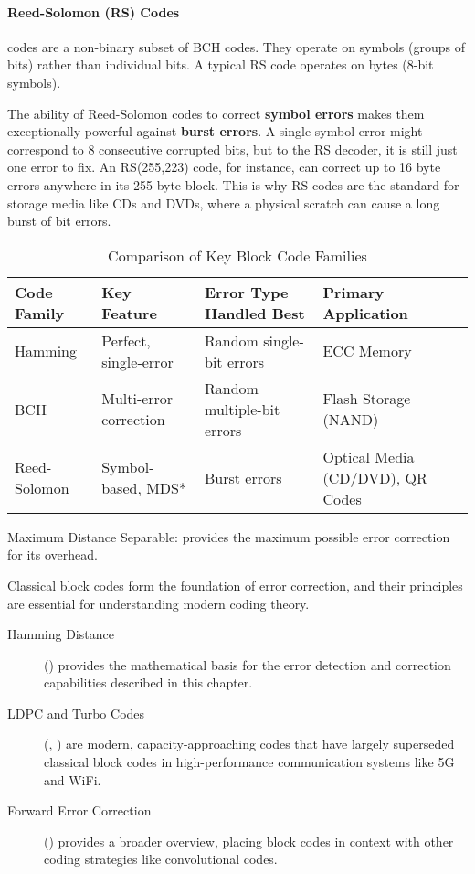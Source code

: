 \paragraph{Reed-Solomon (RS) Codes}
 codes are a non-binary subset of BCH codes. They operate on symbols (groups of bits) rather than individual bits. A typical RS code operates on bytes (8-bit symbols).
\begin{warningbox}
    The ability of Reed-Solomon codes to correct \textbf{symbol errors} makes them exceptionally powerful against \textbf{burst errors}. A single symbol error might correspond to 8 consecutive corrupted bits, but to the RS decoder, it is still just one error to fix. An RS(255,223) code, for instance, can correct up to 16 byte errors anywhere in its 255-byte block. This is why RS codes are the standard for storage media like CDs and DVDs, where a physical scratch can cause a long burst of bit errors.
\end{warningbox}

\begin{table}[H]
    \centering
    \caption{Comparison of Key Block Code Families}
    \label{tab:block-code-summary}
    \begin{tabularx}{\textwidth}{@{}lXXX@{}}
        \toprule
        \tableheaderfont Code Family & \tableheaderfont Key Feature & \tableheaderfont Error Type Handled Best & \tableheaderfont Primary Application \\
        \midrule
        Hamming & Perfect, single-error & Random single-bit errors & ECC Memory \\
        BCH & Multi-error correction & Random multiple-bit errors & Flash Storage (NAND) \\
        Reed-Solomon & Symbol-based, MDS* & Burst errors & Optical Media (CD/DVD), QR Codes \\
        \bottomrule
    \end{tabularx}
    \par\vspace{0.5em}
    \small *Maximum Distance Separable: provides the maximum possible error correction for its overhead.
\end{table}


\begin{importantbox}[title={Further Reading}]
    Classical block codes form the foundation of error correction, and their principles are essential for understanding modern coding theory.
    \begin{description}
        \item[Hamming Distance] () provides the mathematical basis for the error detection and correction capabilities described in this chapter.
        \item[LDPC and Turbo Codes] (, ) are modern, capacity-approaching codes that have largely superseded classical block codes in high-performance communication systems like 5G and WiFi.
        \item[Forward Error Correction] () provides a broader overview, placing block codes in context with other coding strategies like convolutional codes.
    \end{description}
\end{importantbox}